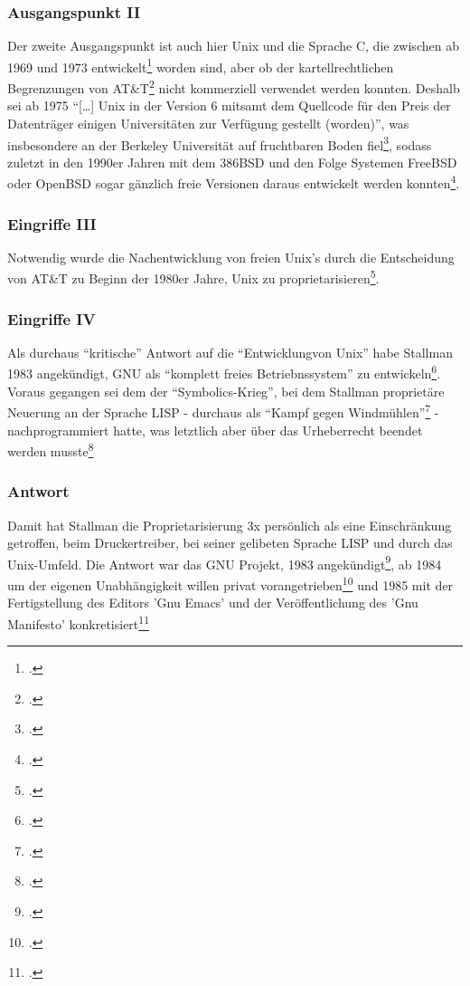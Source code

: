\documentclass[DIV=calc,BCOR=5mm,11pt,headings=small,oneside,abstract=true, toc=bib]{scrartcl}
\begin{document}
\subsubsection{Ausgangspunkt II}
Der zweite Ausgangspunkt ist auch hier Unix und die Sprache C, die zwischen ab
1969 und 1973 entwickelt\footcite[vgl.][25f]{Viesel2006a} worden sind, aber ob
der kartellrechtlichen Begrenzungen von AT\&T\footcite[vgl.][26]{Viesel2006a}
nicht kommerziell verwendet werden konnten. Deshalb sei ab 1975 \enquote{[\ldots]
Unix in der Version 6 mitsamt dem Quellcode für den Preis der Datenträger
einigen Universitäten zur Verfügung gestellt (worden)}, was insbesondere
an der Berkeley Universität auf fruchtbaren Boden
fiel\footcite[vgl.][26]{Viesel2006a}, sodass zuletzt in den 1990er Jahren mit
dem 386BSD und den Folge Systemen FreeBSD oder OpenBSD sogar gänzlich freie
Versionen daraus entwickelt werden konnten\footcite[vgl.][27]{Viesel2006a}.

\subsubsection{Eingriffe III}

Notwendig wurde die Nachentwicklung von freien Unix's durch die Entscheidung von
AT\&T zu Beginn der 1980er Jahre, Unix zu
proprietarisieren\footcite[vgl.][27]{Viesel2006a}.

\subsubsection{Eingriffe IV}

Als durchaus \enquote{kritische} Antwort auf die
\enquote{Entwicklungvon Unix} habe Stallman 1983 angekündigt, GNU als
\enquote{komplett freies Betriebnssystem} zu
entwickeln\footcite[vgl.][27]{Viesel2006a}. Voraus gegangen sei dem der
\enquote{Symbolics-Krieg}, bei dem Stallman proprietäre Neuerung an der
Sprache LISP - durchaus als \enquote{Kampf gegen
Windmühlen}\footcite[vgl.][31]{Viesel2006a} - nachprogrammiert hatte, was
letztlich aber über das Urheberrecht beendet werden
musste\footcite[vgl.][29f]{Viesel2006a}

\subsubsection{Antwort}

Damit hat Stallman die Proprietarisierung 3x persönlich als eine
Einschränkung getroffen, beim Druckertreiber, bei seiner gelibeten Sprache LISP
und durch das Unix-Umfeld. Die Antwort war das GNU Projekt, 1983
angekündigt\footcite[vgl.][27]{Viesel2006a}, ab 1984 um der eigenen
Unabhängigkeit willen privat vorangetrieben\footcite[vgl.][31]{Viesel2006a} und
1985 mit der Fertigstellung des Editors 'Gnu Emacs' und der Veröffentlichung des
'Gnu Manifesto' konkretisiert\footcite[vgl.][32]{Viesel2006a}
\end{document}
